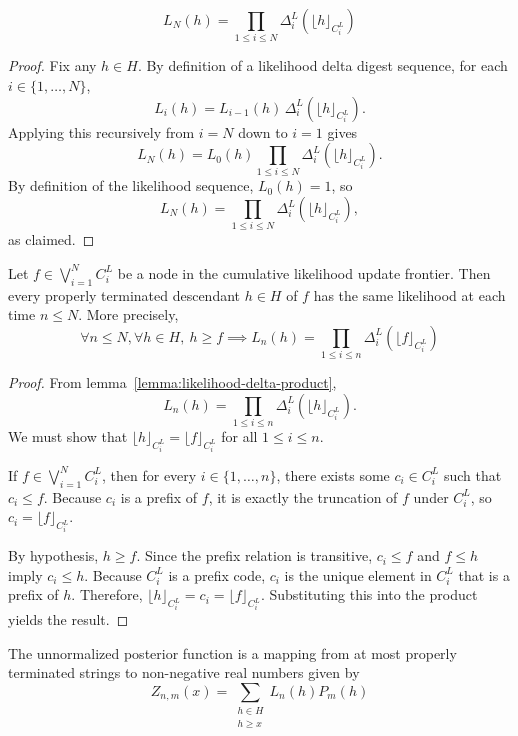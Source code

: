 \begin{lemma}
\label{lemma:likelihood-delta-product}
    $$
    L_N(h) =
    \prod_{1\leq i \leq N} \Delta^L_i(\lfloor h \rfloor_{C^L_i})
    $$
\end{lemma}
\begin{proof}
Fix any $h \in H$. By definition of a likelihood delta digest sequence, for each $i\in\{1,\dots,N\}$,
\[
L_i(h)=L_{i-1}(h)\,\Delta^L_i\!\left(\lfloor h\rfloor_{C^L_i}\right).
\]
Applying this recursively from $i=N$ down to $i=1$ gives
\[
L_N(h)
=
L_0(h)\prod_{1\le i\le N}\Delta^L_i\!\left(\lfloor h\rfloor_{C^L_i}\right).
\]
By definition of the likelihood sequence, $L_0(h)=1$, so
\[
L_N(h)=\prod_{1\le i\le N}\Delta^L_i\!\left(\lfloor h\rfloor_{C^L_i}\right),
\]
as claimed.
\end{proof}

\begin{lemma}
\label{lemma:eventually-constant-likelihoods}
    Let $f \in \bigvee_{i=1}^N C^L_i$ be a node in the cumulative likelihood update frontier.
    Then every properly terminated descendant $h \in H$ of $f$ has the same likelihood at each time
    $n \leq N$. More precisely,
    $$
    \forall n \leq N, \forall h \in H,\ h \geq f \implies L_n(h) = \prod_{1\leq i \leq n} \Delta^L_i(\lfloor f \rfloor_{C^L_i})
    $$
\end{lemma}
\begin{proof}
    From lemma~\ref{lemma:likelihood-delta-product},
    $$
    L_n(h) = \prod_{1 \leq i \leq n} \Delta^L_i(\lfloor h \rfloor_{C^L_i}).
    $$
    We must show that $\lfloor h \rfloor_{C^L_i} = \lfloor f \rfloor_{C^L_i}$ for all $1\leq i \leq n$.
    
    If $f \in \bigvee_{i=1}^N C^L_i$, then for every $i \in \{1, \dots, n\}$, there exists some $c_i \in C^L_i$ such that $c_i \leq f$. Because $c_i$ is a prefix of $f$, it is exactly the truncation of $f$ under $C^L_i$, so $c_i = \lfloor f \rfloor_{C^L_i}$.

    By hypothesis, $h \geq f$. Since the prefix relation is transitive, $c_i \leq f$ and $f \leq h$ imply $c_i \leq h$. Because $C^L_i$ is a prefix code, $c_i$ is the unique element in $C^L_i$ that is a prefix of $h$. 
    Therefore, $\lfloor h \rfloor_{C^L_i} = c_i = \lfloor f \rfloor_{C^L_i}$.
    Substituting this into the product yields the result.
\end{proof}

\begin{definition}
    The unnormalized posterior function is a mapping
    from at most properly terminated strings to non-negative real numbers given by
    $$
    Z_{n,m}(x) = \sum_{\substack{h \in H \\ h \geq x}} L_n(h) P_m(h)
    $$
\end{definition}

